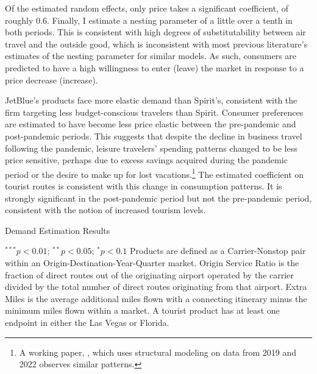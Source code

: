 \documentclass{article}
\begin{document}
    Of the estimated random effects, only price takes a significant coefficient, of roughly $0.6$. Finally, I estimate a nesting parameter of a little over a tenth in both periods. This is consistent with high degrees of substitutability between air travel and the outside good, which is inconsistent with most previous literature's estimates of the nesting parameter for similar models. As such, consumers are predicted to have a high willingness to enter (leave) the market in response to a price decrease (increase).

     JetBlue's products face more elastic demand than Spirit's, consistent with the firm targeting less budget-conscious travelers than Spirit. Consumer preferences are estimated to have become less price elastic between the pre-pandemic and post-pandemic periods. This suggests that despite the decline in business travel following the pandemic, leisure travelers' spending patterns changed to be less price sensitive, perhaps due to excess savings acquired during the pandemic period or the desire to make up for lost vacations.\footnote{A working paper, \citet{ewen_zoom_2023}, which uses structural modeling on data from 2019 and 2022 observes similar patterns.}  The estimated coefficient on tourist routes is consistent with this change in consumption patterns.  It is strongly significant in the post-pandemic period but not the pre-pandemic period, consistent with the notion of increased tourism levels. 
    
    \begin{table}
        \caption{Demand Estimation Results}
        \label{tab:DemandEst}
        \vspace{-15mm}
        \begin{center}
           
        \end{center}
        \vspace{-5mm}
                \footnotesize{$^{***}p<0.01$; $^{**}p<0.05$; $^{*}p<0.1$ Products are defined as a Carrier-Nonstop pair within an Origin-Destination-Year-Quarter market. Origin Service Ratio is the fraction of direct routes out of the originating airport operated by the carrier divided by the total number of direct routes originating from that airport. Extra Miles is the average additional miles flown with a connecting itinerary minus the minimum miles flown within a market.  A tourist product has at least one endpoint in either the Las Vegas or Florida.}

    \end{table}
		
\end{document}
